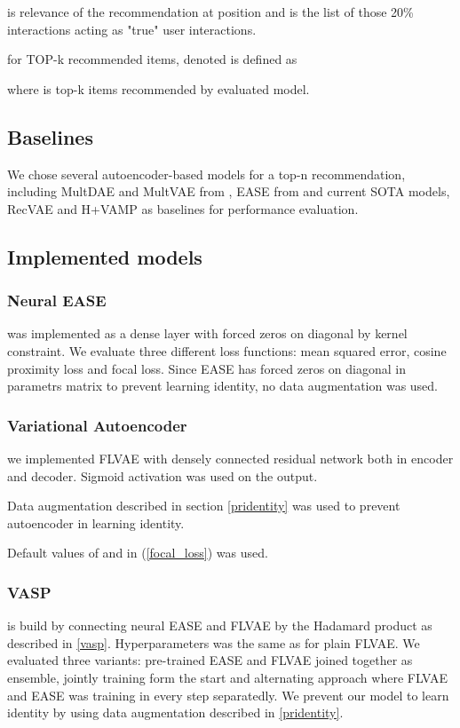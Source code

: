\documentclass[conference]{IEEEtran}
\begin{document}
        
        
         is relevance of the recommendation at position  and  is the list of those 20\% interactions acting as "true" user interactions.
        
         for TOP-k recommended items, denoted  is defined as
        
        
        
        where  is top-k items recommended by evaluated model.
        
    \subsection{Baselines}
        
        We chose several autoencoder-based models for a top-n recommendation, including MultDAE and MultVAE from \cite{Liang2018}, EASE from \cite{Steck2019} and current SOTA models, RecVAE \cite{Shenbin2020} and H+VAMP \cite{Kim2019} as baselines for performance evaluation.
        
 
    \subsection{Implemented models}
        
\subsubsection{Neural EASE} was implemented as a dense layer with forced zeros on diagonal by kernel constraint. We evaluate three different loss functions: mean squared error, cosine proximity loss and focal loss. Since EASE has forced zeros on diagonal in parametrs matrix to prevent learning identity, no data augmentation was used.
    
        \subsubsection{Variational Autoencoder} we implemented FLVAE  with densely connected residual network both in encoder and decoder. Sigmoid activation was used on the output. 
        


        Data augmentation described in section \ref{pridentity} was used to prevent autoencoder in learning identity.  
        
        Default values of  and   in (\ref{focal_loss}) was used.
        
        \subsubsection{VASP} is build by connecting neural EASE and FLVAE by the Hadamard product as described in \ref{vasp}. Hyperparameters was the same as for plain FLVAE.
        We evaluated three variants: pre-trained EASE and FLVAE joined together as ensemble, jointly training form the start and alternating approach where FLVAE and EASE was training in every step separatedly. We prevent our model to learn identity by using data augmentation described in \ref{pridentity}.
        
\end{document}
